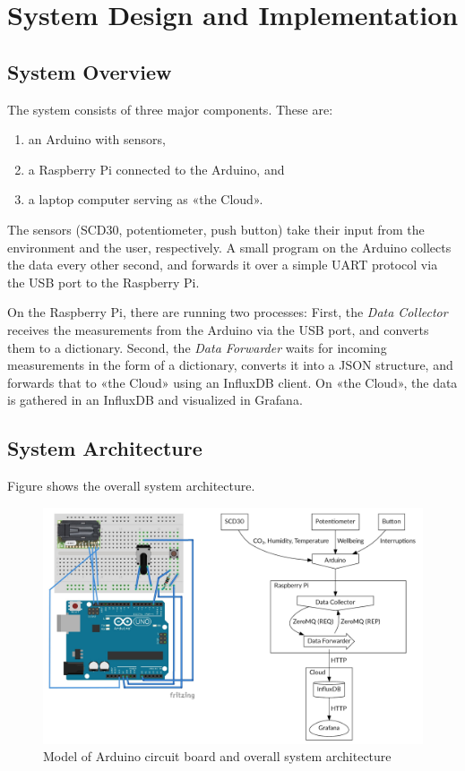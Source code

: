 \section{System Design and Implementation}

\subsection{System Overview}

The system consists of three major components. These are:

\begin{enumerate}
    \item an Arduino with sensors,
    \item a Raspberry Pi connected to the Arduino, and
    \item a laptop computer serving as «the Cloud».
\end{enumerate}

The sensors (SCD30, potentiometer, push button) take their input from the environment and the user, respectively. A small program on the Arduino collects the data every other second, and forwards it over a simple UART protocol via the USB port to the Raspberry Pi.

On the Raspberry Pi, there are running two processes: First, the \textit{Data Collector} receives the measurements from the Arduino via the USB port, and converts them to a dictionary. Second, the \textit{Data Forwarder} waits for incoming measurements in the form of a dictionary, converts it into a JSON structure, and forwards that to «the Cloud» using an InfluxDB client. On «the Cloud», the data is gathered in an InfluxDB and visualized in Grafana.

\subsection{System Architecture}

Figure  shows the overall system architecture.

\begin{figure}
	\centering
	\includegraphics[width=\linewidth]{Architecture_Arduino.jpg}
	\caption{Model of Arduino circuit board and overall system architecture}
	\label{fig:architecture}
\end{figure}

